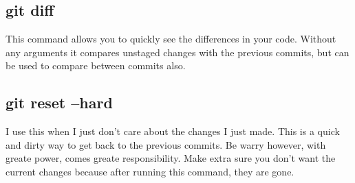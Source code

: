 \documentclass{article}
\begin{document}
\subsection{git diff}
This command allows you to quickly see the differences in your code. Without any arguments it compares unstaged changes
with the previous commits, but can be used to compare between commits also.
\subsection{git reset --hard}
I use this when I just don't care about the changes I just made. This is a quick and dirty way to
get back to the previous commits. Be warry however, with greate power, comes greate responsibility.
Make extra sure you don't want the current changes because after running this command, they are gone.
\end{document}
